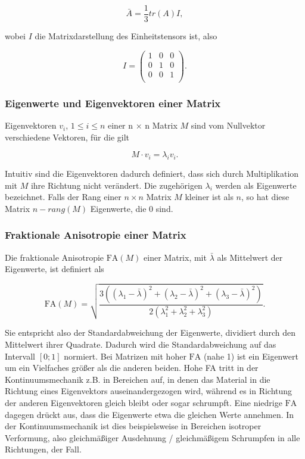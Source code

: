 \documentclass[a4paper,fontsize=12pt,toc=bib,parskip=half,ngerman]{scrartcl}
\begin{document}
\begin{equation}
\bar{A} = \frac{1}{3}tr(A)I,
\end{equation}

wobei $I$ die Matrixdarstellung des Einheitstensors ist, also

\begin{equation}
	I = 	
	\begin{pmatrix}
		1 & 0 & 0 \\
		0 & 1 & 0 \\
		0 & 0 & 1 \\
	\end{pmatrix}.
\end{equation}

\subsubsection{Eigenwerte und Eigenvektoren einer Matrix}

Eigenvektoren $v_i$, $1\leq i\leq n$ einer n $\times$ n Matrix $M$ sind vom Nullvektor verschiedene Vektoren, f\"ur die gilt

\begin{equation}
	M \cdot v_i = \lambda_i v_i.
\end{equation}

Intuitiv sind die Eigenvektoren dadurch definiert, dass sich durch Multiplikation mit $M$ ihre Richtung nicht ver\"andert. Die zugeh\"origen $\lambda_i$ werden als Eigenwerte bezeichnet.
Falls der Rang einer $n\times n$ Matrix $M$ kleiner ist als $n$, so hat diese Matrix $n - rang(M)$ Eigenwerte, die 0 sind.

\subsubsection{Fraktionale Anisotropie einer Matrix}
Die fraktionale Anisotropie $\text{FA}(M)$ einer Matrix, mit $\bar{\lambda}$ als Mittelwert der Eigenwerte, ist definiert als

\begin{equation}
	\text{FA}(M) = \sqrt{\frac{3((\lambda_1 - \bar{\lambda})^2 + (\lambda_2 - \bar{\lambda})^2 + (\lambda_3 - \bar{\lambda})^2)}{2(\lambda_1^2 + \lambda_2^2 + \lambda_3^2)}}.
\end{equation}

Sie entspricht also der Standardabweichung der Eigenwerte, dividiert durch den Mittelwert ihrer Quadrate. Dadurch wird die Standardabweichung auf das Intervall $[0;1]$ normiert. Bei Matrizen mit hoher $\text{FA}$ (nahe 1) ist ein Eigenwert um ein Vielfaches gr\"o{\ss}er als die anderen beiden. Hohe FA tritt in der Kontinuumsmechanik z.B. in Bereichen auf, in denen das Material in die Richtung eines Eigenvektors auseinandergezogen wird, w\"ahrend es in Richtung der anderen Eigenvektoren gleich bleibt oder sogar schrumpft. Eine niedrige $\text{FA}$ dagegen dr\"uckt aus, dass die Eigenwerte etwa die gleichen Werte annehmen. In der Kontinuumsmechanik ist dies beispielsweise in Bereichen isotroper Verformung, also gleichm\"a{\ss}iger Ausdehnung / gleichm\"a{\ss}igem Schrumpfen in alle Richtungen, der Fall.
\end{document}
